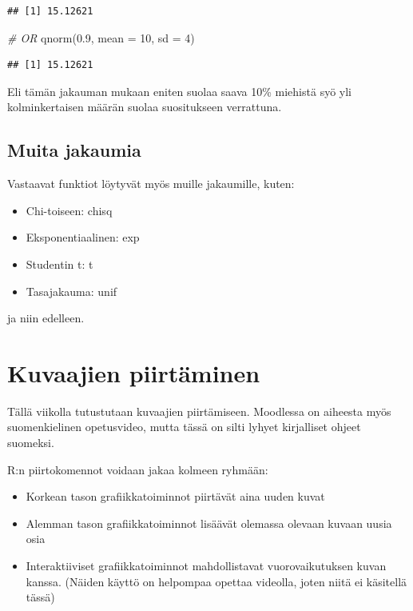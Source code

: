 \documentclass[
]{book}
\newenvironment{Shaded}{\begin{snugshade}}{\end{snugshade}}
\newcommand{\AttributeTok}[1]{\textcolor[rgb]{0.77,0.63,0.00}{#1}}
\newcommand{\CommentTok}[1]{\textcolor[rgb]{0.56,0.35,0.01}{\textit{#1}}}
\newcommand{\DecValTok}[1]{\textcolor[rgb]{0.00,0.00,0.81}{#1}}
\newcommand{\FloatTok}[1]{\textcolor[rgb]{0.00,0.00,0.81}{#1}}
\newcommand{\FunctionTok}[1]{\textcolor[rgb]{0.00,0.00,0.00}{#1}}
\newcommand{\NormalTok}[1]{#1}
\providecommand{\tightlist}{%
  \setlength{\itemsep}{0pt}\setlength{\parskip}{0pt}}
\begin{document}
\begin{verbatim}
## [1] 15.12621
\end{verbatim}

\begin{Shaded}
\begin{Highlighting}[]
\CommentTok{\# OR}
\FunctionTok{qnorm}\NormalTok{(}\FloatTok{0.9}\NormalTok{, }\AttributeTok{mean =} \DecValTok{10}\NormalTok{, }\AttributeTok{sd =} \DecValTok{4}\NormalTok{)}
\end{Highlighting}
\end{Shaded}

\begin{verbatim}
## [1] 15.12621
\end{verbatim}

Eli tämän jakauman mukaan eniten suolaa saava 10\% miehistä syö yli kolminkertaisen määrän suolaa suositukseen verrattuna.

\hypertarget{muita-jakaumia}{%
\section{Muita jakaumia}\label{muita-jakaumia}}

Vastaavat funktiot löytyvät myös muille jakaumille, kuten:

\begin{itemize}
\tightlist
\item
  Chi-toiseen: chisq
\item
  Eksponentiaalinen: exp
\item
  Studentin t: t
\item
  Tasajakauma: unif
\end{itemize}

ja niin edelleen.

\hypertarget{plotting}{%
\chapter{Kuvaajien piirtäminen}\label{plotting}}

Tällä viikolla tutustutaan kuvaajien piirtämiseen. Moodlessa on aiheesta myös suomenkielinen opetusvideo, mutta tässä on silti lyhyet kirjalliset ohjeet suomeksi.

R:n piirtokomennot voidaan jakaa kolmeen ryhmään:

\begin{itemize}
\tightlist
\item
  Korkean tason grafiikkatoiminnot piirtävät aina uuden kuvat
\item
  Alemman tason grafiikkatoiminnot lisäävät olemassa olevaan kuvaan uusia osia
\item
  Interaktiiviset grafiikkatoiminnot mahdollistavat vuorovaikutuksen kuvan kanssa. (Näiden käyttö on helpompaa opettaa videolla, joten niitä ei käsitellä tässä)
\end{itemize}
\end{document}
